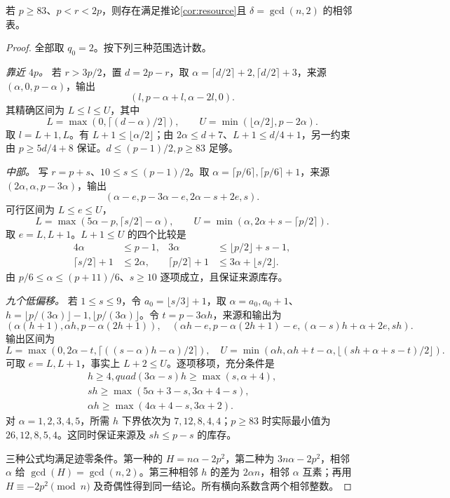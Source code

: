 \begin{lemma}\label{lem:upper-supply}
若 $p\ge83$、$p<r<2p$，则存在满足推论\ref{cor:resource}且 $\delta=\gcd(n,2)$ 的相邻表。
\end{lemma}
\begin{proof}
全部取 $q_0=2$。按下列三种范围选计数。

\emph{靠近 $4p$。} 若 $r>3p/2$，置 $d=2p-r$，取 $\alpha=\lceil d/2\rceil+2,\lceil d/2\rceil+3$，来源 $(\alpha,0,p-\alpha)$，输出
\[(l,p-\alpha+l,\alpha-2l,0).
\]
其精确区间为 $L\le l\le U$，其中
\[L=\max(0,\lceil(d-\alpha)/2\rceil),\qquad
U=\min(\lfloor\alpha/2\rfloor,p-2\alpha).
\]
取 $l=L+1,L$。有 $L+1\le\lfloor\alpha/2\rfloor$；由 $2\alpha\le d+7$、$L+1\le d/4+1$，另一约束由 $p\ge5d/4+8$ 保证。$d\le(p-1)/2,p\ge83$ 足够。

\emph{中部。} 写 $r=p+s$、$10\le s\le(p-1)/2$。取 $\alpha=\lceil p/6\rceil,\lceil p/6\rceil+1$，来源 $(2\alpha,\alpha,p-3\alpha)$，输出
\[(\alpha-e,p-3\alpha-e,2\alpha-s+2e,s).
\]
可行区间为 $L\le e\le U$，
\[L=\max(5\alpha-p,\lceil s/2\rceil-\alpha),\qquad
U=\min(\alpha,2\alpha+s-\lceil p/2\rceil).
\]
取 $e=L,L+1$。$L+1\le U$ 的四个比较是
\begin{align*}
4\alpha&\le p-1,&3\alpha&\le\lfloor p/2\rfloor+s-1,\\
\lceil s/2\rceil+1&\le2\alpha,&\lceil p/2\rceil+1&\le3\alpha+\lfloor s/2\rfloor.
\end{align*}
由 $p/6\le\alpha\le(p+11)/6$、$s\ge10$ 逐项成立，且保证来源库存。

\emph{九个低偏移。} 若 $1\le s\le9$，令 $a_0=\lfloor s/3\rfloor+1$，取 $\alpha=a_0,a_0+1$、$h=\lfloor p/(3\alpha)\rfloor-1,\lfloor p/(3\alpha)\rfloor$。令 $t=p-3\alpha h$，来源和输出为
\[
(\alpha(h+1),\alpha h,p-\alpha(2h+1)),\quad
(\alpha h-e,p-\alpha(2h+1)-e,(\alpha-s)h+\alpha+2e,sh).
\]
输出区间为
\[
L=\max(0,2\alpha-t,\lceil((s-\alpha)h-\alpha)/2\rceil),\quad
U=\min(\alpha h,\alpha h+t-\alpha,\lfloor(sh+\alpha+s-t)/2\rfloor).
\]
可取 $e=L,L+1$，事实上 $L+2\le U$。逐项移项，充分条件是
\[
\begin{gathered}
h\ge4,quad(3\alpha-s)h\ge\max(s,\alpha+4),\\
sh\ge\max(5\alpha+3-s,3\alpha+4-s),\\
\alpha h\ge\max(4\alpha+4-s,3\alpha+2).
\end{gathered}
\]
对 $\alpha=1,2,3,4,5$，所需 $h$ 下界依次为 $7,12,8,4,4$；$p\ge83$ 时实际最小值为 $26,12,8,5,4$。这同时保证来源及 $sh\le p-s$ 的库存。

三种公式均满足迹零条件。第一种的 $H=n\alpha-2p^2$，第二种为 $3n\alpha-2p^2$，相邻 $\alpha$ 给 $\gcd(H)=\gcd(n,2)$。第三种相邻 $h$ 的差为 $2\alpha n$，相邻 $\alpha$ 互素；再用 $H\equiv-2p^2\pmod n$ 及奇偶性得到同一结论。所有横向系数含两个相邻整数。
\end{proof}

